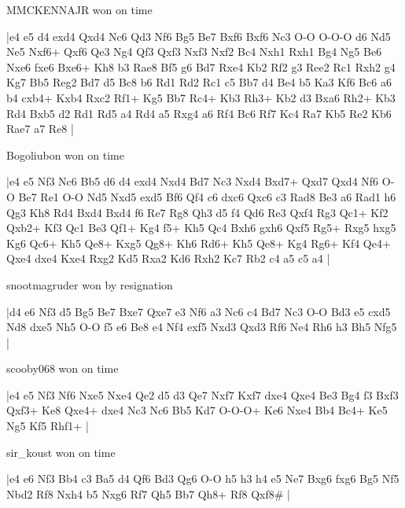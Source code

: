 \showboard

MMCKENNAJR won on time

\makegametitle
|e4 e5 d4 exd4 Qxd4 Nc6 Qd3 Nf6 Bg5 Be7 Bxf6 Bxf6 Nc3 O-O O-O-O d6 Nd5 Ne5 Nxf6+ Qxf6 Qe3 Ng4 Qf3 Qxf3 Nxf3 Nxf2 Bc4 Nxh1 Rxh1 Bg4 Ng5 Be6 Nxe6 fxe6 Bxe6+ Kh8 b3 Rae8 Bf5 g6 Bd7 Rxe4 Kb2 Rf2 g3 Ree2 Rc1 Rxh2 g4 Kg7 Bb5 Reg2 Bd7 d5 Bc8 b6 Rd1 Rd2 Rc1 c5 Bb7 d4 Be4 b5 Ka3 Kf6 Bc6 a6 b4 cxb4+ Kxb4 Rxc2 Rf1+ Kg5 Bb7 Rc4+ Kb3 Rh3+ Kb2 d3 Bxa6 Rh2+ Kb3 Rd4 Bxb5 d2 Rd1 Rd5 a4 Rd4 a5 Rxg4 a6 Rf4 Bc6 Rf7 Kc4 Ra7 Kb5 Re2 Kb6 Rae7 a7 Re8  |

\showboard

Bogoliubon won on time

\makegametitle
|e4 e5 Nf3 Nc6 Bb5 d6 d4 exd4 Nxd4 Bd7 Nc3 Nxd4 Bxd7+ Qxd7 Qxd4 Nf6 O-O Be7 Re1 O-O Nd5 Nxd5 exd5 Bf6 Qf4 c6 dxc6 Qxc6 c3 Rad8 Be3 a6 Rad1 h6 Qg3 Kh8 Rd4 Bxd4 Bxd4 f6 Re7 Rg8 Qh3 d5 f4 Qd6 Re3 Qxf4 Rg3 Qc1+ Kf2 Qxb2+ Kf3 Qc1 Be3 Qf1+ Kg4 f5+ Kh5 Qc4 Bxh6 gxh6 Qxf5 Rg5+ Rxg5 hxg5 Kg6 Qc6+ Kh5 Qe8+ Kxg5 Qg8+ Kh6 Rd6+ Kh5 Qe8+ Kg4 Rg6+ Kf4 Qe4+ Qxe4 dxe4 Kxe4 Rxg2 Kd5 Rxa2 Kd6 Rxh2 Kc7 Rb2 c4 a5 c5 a4  |

\showboard

snootmagruder won by resignation

\makegametitle
|d4 e6 Nf3 d5 Bg5 Be7 Bxe7 Qxe7 e3 Nf6 a3 Nc6 c4 Bd7 Nc3 O-O Bd3 e5 cxd5 Nd8 dxe5 Nh5 O-O f5 e6 Be8 e4 Nf4 exf5 Nxd3 Qxd3 Rf6 Ne4 Rh6 h3 Bh5 Nfg5  |

\showboard

scooby068 won on time

\makegametitle
|e4 e5 Nf3 Nf6 Nxe5 Nxe4 Qe2 d5 d3 Qe7 Nxf7 Kxf7 dxe4 Qxe4 Be3 Bg4 f3 Bxf3 Qxf3+ Ke8 Qxe4+ dxe4 Nc3 Nc6 Bb5 Kd7 O-O-O+ Ke6 Nxe4 Bb4 Bc4+ Ke5 Ng5 Kf5 Rhf1+  |

\showboard

sir\_koust won on time

\makegametitle
|e4 e6 Nf3 Bb4 c3 Ba5 d4 Qf6 Bd3 Qg6 O-O h5 h3 h4 e5 Ne7 Bxg6 fxg6 Bg5 Nf5 Nbd2 Rf8 Nxh4 b5 Nxg6 Rf7 Qh5 Bb7 Qh8+ Rf8 Qxf8\#  |

\showboard

